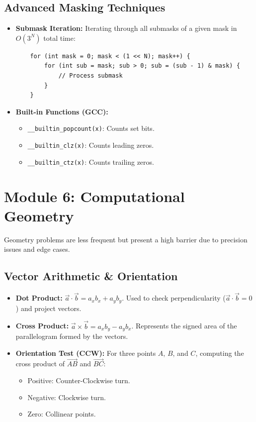 \documentclass[10pt,journal,compsoc,onecolumn]{IEEEtran}
\begin{document}
\subsection{Advanced Masking Techniques}
\begin{itemize}
    \item \textbf{Submask Iteration:} Iterating through all submasks of a given mask in $O(3^N)$ total time:
    \begin{verbatim}
    for (int mask = 0; mask < (1 << N); mask++) {
        for (int sub = mask; sub > 0; sub = (sub - 1) & mask) {
            // Process submask
        }
    }
    \end{verbatim}
    \item \textbf{Built-in Functions (GCC):}
    \begin{itemize}
        \item \texttt{\_\_builtin\_popcount(x)}: Counts set bits.
        \item \texttt{\_\_builtin\_clz(x)}: Counts leading zeros.
        \item \texttt{\_\_builtin\_ctz(x)}: Counts trailing zeros.
    \end{itemize}
\end{itemize}

\section{Module 6: Computational Geometry}
\label{sec:geometry}

Geometry problems are less frequent but present a high barrier due to precision issues and edge cases.

\subsection{Vector Arithmetic \& Orientation}
\begin{itemize}
    \item \textbf{Dot Product:} $\vec{a} \cdot \vec{b} = a_x b_x + a_y b_y$. Used to check perpendicularity ($\vec{a} \cdot \vec{b} = 0$) and project vectors.
    \item \textbf{Cross Product:} $\vec{a} \times \vec{b} = a_x b_y - a_y b_x$. Represents the signed area of the parallelogram formed by the vectors.
    \item \textbf{Orientation Test (CCW):} For three points $A$, $B$, and $C$, computing the cross product of $\vec{AB}$ and $\vec{BC}$:
    \begin{itemize}
        \item Positive: Counter-Clockwise turn.
        \item Negative: Clockwise turn.
        \item Zero: Collinear points.
    \end{itemize}
\end{itemize}
\end{document}

